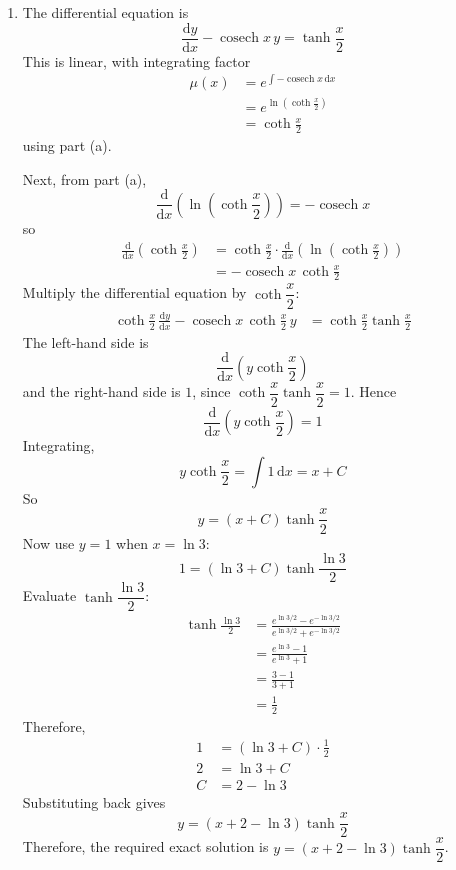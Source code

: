 \documentclass[leqno]{article}
\begin{document}
\begin{enumerate}[
  label=\textbf{\arabic*.},
  leftmargin=*,
  topsep=0pt,
  partopsep=0pt,
  parsep=0pt
]
\begin{tcolorbox}[colback=white, colframe=scarlet, title={\textbf{Solution}}, breakable, grow to left by=6mm, grow to right by=10mm]
\begin{enumerate}[label=\textbf{(\alph*)}]
  \item The differential equation is
\[
\frac{\mathrm{d}y}{\mathrm{d}x}-\operatorname{cosech} x\,y=\tanh \frac{x}{2}
\]
This is linear, with integrating factor
\begin{align*}
\mu(x)
&= e^{\int -\operatorname{cosech} x\,\mathrm{d}x} \\
&= e^{\ln\left(\coth \frac{x}{2}\right)} \\
&= \coth \frac{x}{2}
\end{align*}
using part (a).

Next, from part (a),
\[
\frac{\mathrm{d}}{\mathrm{d}x}\left(\ln\left(\coth \frac{x}{2}\right)\right)=-\operatorname{cosech} x
\]
so
\begin{align*}
\frac{\mathrm{d}}{\mathrm{d}x}\left(\coth \frac{x}{2}\right)
&= \coth \frac{x}{2}\cdot \frac{\mathrm{d}}{\mathrm{d}x}\left(\ln\left(\coth \frac{x}{2}\right)\right) \\
&= -\operatorname{cosech} x\,\coth \frac{x}{2}
\end{align*}
Multiply the differential equation by \(\coth \dfrac{x}{2}\):
\begin{align*}
\coth \frac{x}{2}\,\frac{\mathrm{d}y}{\mathrm{d}x}
-\operatorname{cosech} x\,\coth \frac{x}{2}\,y
&= \coth \frac{x}{2}\tanh \frac{x}{2}
\end{align*}
The left-hand side is
\[
\frac{\mathrm{d}}{\mathrm{d}x}\left(y\coth \frac{x}{2}\right)
\]
and the right-hand side is \(1\), since \(\coth \dfrac{x}{2}\tanh \dfrac{x}{2}=1\). Hence
\[
\frac{\mathrm{d}}{\mathrm{d}x}\left(y\coth \frac{x}{2}\right)=1
\]
Integrating,
\[
y\coth \frac{x}{2}=\int 1\,\mathrm{d}x=x+C
\]
So
\[
y=(x+C)\tanh \frac{x}{2}
\]
Now use \(y=1\) when \(x=\ln 3\):
\[
1=(\ln 3+C)\tanh \frac{\ln 3}{2}
\]
Evaluate \(\tanh \dfrac{\ln 3}{2}\):
\begin{align*}
\tanh \frac{\ln 3}{2}
&= \frac{e^{\ln 3/2}-e^{-\ln 3/2}}{e^{\ln 3/2}+e^{-\ln 3/2}} \\
&= \frac{e^{\ln 3}-1}{e^{\ln 3}+1} \\
&= \frac{3-1}{3+1} \\
&= \frac{1}{2}
\end{align*}
Therefore,
\begin{align*}
1&=(\ln 3+C)\cdot \frac{1}{2} \\
2&=\ln 3+C \\
C&=2-\ln 3
\end{align*}
Substituting back gives
\[
y=(x+2-\ln 3)\tanh \frac{x}{2}
\]
Therefore, the required exact solution is \(y=(x+2-\ln 3)\tanh \dfrac{x}{2}\).
\end{enumerate}
\end{tcolorbox}



\end{enumerate}
\end{document}
